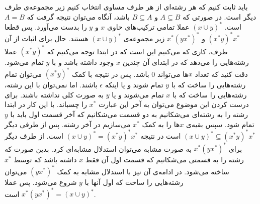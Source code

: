 \subsubsection{}
باید ثابت کنیم که هر رشته‌ای از هر طرف مساوی انتخاب کنیم زیر مجموعه‌ی طرف دیگر است. در صورتی که
$A \subseteq B$ و $B \subseteq A$
باشد، آنگاه می‌توان نتیجه گرفت که
$A = B$
است.
$(x \cup y)^*$
عملا تمامی ترکیب‌های حاوی
$x$ و $y$
را بدست می‌آورد. پس قطعا
$(x^*y)^*x^*$ و $x^*(yx^*)^*$
زیر مجموعه‌ی
$(x \cup y)^*$
هستند. حال برای اثبات از آن طرف، کاری که می‌کنیم این است که در ابتدا توجه می‌کنیم که
$(x^*y)^*$
عملا رشته‌هایی را می‌دهد که در ابتدای آن چندین
$x$
وجود داشته باشد و با
$y$
تمام می‌شود. دقت کنید که تعداد
$x$ها
می‌تواند 0 باشد. پس در نتیجه با کمک
$(x^*y)^*$
می‌توان تمام رشته‌هایی را ساخت که با
$y$
تمام شوند و یا اینکه
$\epsilon$
باشند. اما نمی‌توان با این رشته، رشته‌هایی را ساخت که با
$x$
تمام می‌شوند و یا
$y$
به صورت کلی نداشته باشند. برای درست کردن این موضوع می‌توان به آخر این عبارت
$x^*$
را چسباند. با این کار در ابتدا رشته را به رشته‌ای می‌شکانیم به دو قسمت می‌شکانیم که آخر قسمت اول باید
با
$y$
تمام شود. سپس بقیه‌ی
$x$ها
را به کمک
$x^*$
می‌سازیم در آخر رشته. پس از طرفی دیگر
$(x \cup y)^* \subseteq (x^*y)^*x^*$
است در نتیجه
$(x \cup y)^* = (x^*y)^*x^*$
است. از طرف دیگر برای
$x^*(yx^*)^*$
به صورت مشابه می‌توان استدلال مشابه‌ای کرد. بدین صورت که رشته را به قسمتی می‌شکانیم که قسمت اول آن فقط
$x$
داشته باشد که توسط
$x^*$
ساخته می‌شود. در ادامه‌ی آن نیز با استدلال مشابه به کمک
$(yx^*)^*$
می‌توان رشته‌هایی را ساخت که اول آنها با
$y$
شروع می‌شود. پس عملا
$x^*(yx^*)^* = (x \cup y)^*$
است.
